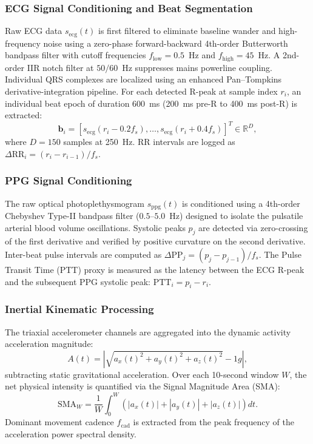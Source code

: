 \documentclass{ieeeaccess}
\begin{document}
\subsubsection{ECG Signal Conditioning and Beat Segmentation}
Raw ECG data $s_{\mathrm{ecg}}(t)$ is first filtered to eliminate baseline wander and high-frequency noise using a zero-phase forward-backward 4th-order Butterworth bandpass filter with cutoff frequencies $f_{\mathrm{low}} = 0.5$~Hz and $f_{\mathrm{high}} = 45$~Hz. A 2nd-order IIR notch filter at $50/60$~Hz suppresses mains powerline coupling. Individual QRS complexes are localized using an enhanced Pan--Tompkins derivative-integration pipeline. For each detected R-peak at sample index $r_i$, an individual beat epoch of duration 600~ms (200~ms pre-R to 400~ms post-R) is extracted:
\begin{equation}
\mathbf{b}_i = \left[ s_{\mathrm{ecg}}(r_i - 0.2 f_s), \dots, s_{\mathrm{ecg}}(r_i + 0.4 f_s) \right]^T \in \mathbb{R}^{D},
\end{equation}
where $D = 150$ samples at 250~Hz. RR intervals are logged as $\Delta \mathrm{RR}_i = (r_i - r_{i-1}) / f_s$.

\subsubsection{PPG Signal Conditioning}
The raw optical photoplethysmogram $s_{\mathrm{ppg}}(t)$ is conditioned using a 4th-order Chebyshev Type-II bandpass filter ($0.5$--$5.0$~Hz) designed to isolate the pulsatile arterial blood volume oscillations. Systolic peaks $p_j$ are detected via zero-crossing of the first derivative and verified by positive curvature on the second derivative. Inter-beat pulse intervals are computed as $\Delta \mathrm{PP}_j = (p_j - p_{j-1}) / f_s$. The Pulse Transit Time (PTT) proxy is measured as the latency between the ECG R-peak and the subsequent PPG systolic peak: $\mathrm{PTT}_i = p_i - r_i$.

\subsubsection{Inertial Kinematic Processing}
The triaxial accelerometer channels are aggregated into the dynamic activity acceleration magnitude:
\begin{equation}
A(t) = \left| \sqrt{a_x(t)^2 + a_y(t)^2 + a_z(t)^2} - 1g \right|,
\end{equation}
subtracting static gravitational acceleration. Over each 10-second window $W$, the net physical intensity is quantified via the Signal Magnitude Area (SMA):
\begin{equation}
\mathrm{SMA}_W = \frac{1}{W}\int_{0}^{W} \left( |a_x(t)| + |a_y(t)| + |a_z(t)| \right) dt.
\end{equation}
Dominant movement cadence $f_{\mathrm{cad}}$ is extracted from the peak frequency of the acceleration power spectral density.
\end{document}
